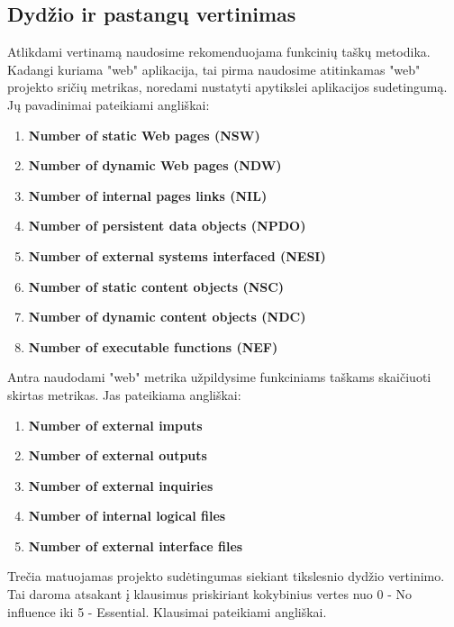 \documentclass[a4paper,12pt]{article}
\begin{document}
\setlength\parindent{24pt}
\begin{center}

\section{ Dydžio ir pastangų vertinimas}
Atlikdami vertinamą naudosime rekomenduojama funkcinių taškų metodika. Kadangi kuriama "web" aplikacija, tai pirma naudosime atitinkamas "web" projekto sričių metrikas, noredami nustatyti apytikslei aplikacijos sudetingumą. Jų pavadinimai pateikiami angliškai:
\begin{enumerate}
\item \textbf{Number of static Web pages (NSW)}
\item \textbf{Number of dynamic Web pages (NDW)}
\item \textbf{Number of internal pages links (NIL)}
\item \textbf{Number of persistent data objects (NPDO)}
\item \textbf{Number of external systems interfaced (NESI)}
\item \textbf{Number of static content objects (NSC)}
\item \textbf{Number of dynamic content objects (NDC)}
\item \textbf{Number of executable functions
(NEF)}
\end{enumerate}
Antra naudodami "web" metrika užpildysime funkciniams taškams skaičiuoti skirtas metrikas.
Jas pateikiama angliškai:
\begin{enumerate}
\item \textbf{Number of external imputs}
\item \textbf{Number of external outputs}
\item \textbf{Number of external inquiries}
\item \textbf{Number of internal logical files}
\item \textbf{Number of external interface files}
\end{enumerate}
Trečia matuojamas projekto sudėtingumas siekiant tikslesnio dydžio vertinimo. Tai daroma atsakant į klausimus priskiriant kokybinius vertes nuo 0 - No influence iki 5 - Essential. Klausimai pateikiami angliškai.
\begin{enumerate}

\end{enumerate}
\end{center}
\end{document}
